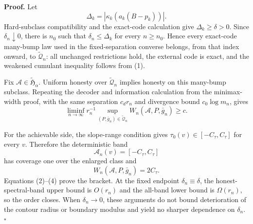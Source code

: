 \textbf{Proof.}
Let
\[
 \Delta_k=|\kappa_k(a_k(B-p_k))|. \tag{1}
\]
Hard-subclass compatibility and the exact-code calculation give \(\Delta_k\ge\delta>0\). Since \(\delta_n\downarrow0\), there is \(n_0\) such that \(\delta_n\le\Delta_k\) for every \(n\ge n_0\). Hence every exact-code many-bump law used in the fixed-separation converse belongs, from that index onward, to \(\widetilde{\mathcal Q}_n\): all unchanged restrictions hold, the external code is exact, and the weakened cumulant inequality follows from (1).

Fix \(\mathcal A\in\widetilde{\mathfrak H}_\alpha\). Uniform honesty over \(\widetilde{\mathcal Q}_n\) implies honesty on this many-bump subclass. Repeating the decoder and information calculation from the minimax-width proof, with the same separation \(c_dr_n\) and divergence bound \(c_0\log m_n\), gives
\[
 \liminf_{n\to\infty}r_n^{-1}
 \sup_{(P,\bar g_n)\in\widetilde{\mathcal Q}_n}
 W_n(\mathcal A,P,\bar g_n)\ge c. \tag{2}
\]

For the achievable side, the slope-range condition gives \(\tau_0(v)\in[-C_\tau,C_\tau]\) for every \(v\). Therefore the deterministic band
\[
 \mathcal A_n(v)=[-C_\tau,C_\tau] \tag{3}
\]
has coverage one over the enlarged class and
\[
 W_n(\mathcal A,P,\bar g_n)=2C_\tau. \tag{4}
\]
Equations (2)--(4) prove the bracket. At the fixed endpoint \(\delta_n\equiv\delta\), the honest-spectral-band upper bound is \(O(r_n)\) and the all-band lower bound is \(\Omega(r_n)\), so the order closes. When \(\delta_n\to0\), these arguments do not bound deterioration of the contour radius or boundary modulus and yield no sharper dependence on \(\delta_n\). \(\square\)